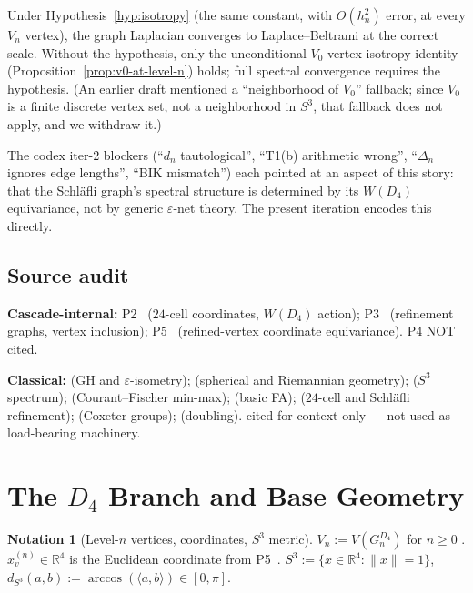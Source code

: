 \documentclass[11pt, a4paper]{amsart}
\theoremstyle{definition}
\newtheorem{notation}[theorem]{Notation}
\newcommand{\R}{\mathbb{R}}
\newcommand{\dsph}{d_{S^3}}
\begin{document}
Under Hypothesis~\ref{hyp:isotropy} (the same constant, with
$O(h_n^2)$ error, at every $V_n$ vertex), the graph Laplacian
converges to Laplace--Beltrami at the correct scale. Without the
hypothesis, only the unconditional $V_0$-vertex isotropy
identity (Proposition~\ref{prop:v0-at-level-n}) holds; full
spectral convergence requires the hypothesis. (An earlier draft
mentioned a ``neighborhood of $V_0$'' fallback; since $V_0$ is
a finite discrete vertex set, not a neighborhood in $S^3$, that
fallback does not apply, and we withdraw it.)

The codex iter-2 blockers (``$d_n$ tautological'', ``T1(b)
arithmetic wrong'', ``$\Delta_n$ ignores edge lengths'', ``BIK
mismatch'') each pointed at an aspect of this story: that the
Schl\"{a}fli graph's spectral structure is determined by its
$W(D_4)$ equivariance, not by generic $\varepsilon$-net theory.
The present iteration encodes this directly.

\subsection{Source audit}

\textbf{Cascade-internal:}
P2~\cite{AlgebraicSubstrate} ($24$-cell coordinates, $W(D_4)$
action);
P3~\cite{RefinementSpaces} (refinement graphs, vertex inclusion);
P5~\cite{MetricProjection} (refined-vertex coordinate
equivariance). P4 NOT cited.

\textbf{Classical:}
\cite{BuragoBuragoIvanov} (GH and $\varepsilon$-isometry);
\cite{doCarmo, PetersenRiemannian} (spherical and Riemannian
geometry); \cite{BerardSpectralGeometry} ($S^3$ spectrum);
\cite[\S VIII.8]{Kato} (Courant--Fischer min-max);
\cite{ReedSimonI} (basic FA);
\cite{CoxeterRegularPolytopes} ($24$-cell and Schl\"{a}fli
refinement); \cite{Humphreys} (Coxeter groups);
\cite{HeinonenAnalysis} (doubling).
\cite{BuragoIvanovKurylev} cited for context only --- not used
as load-bearing machinery.

\section{The $D_4$ Branch and Base Geometry}
\label{sec:D4-base}

\begin{notation}[Level-$n$ vertices, coordinates, $S^3$ metric]
\label{not:basic}
$V_n := V(G_n^{D_4})$ for $n \geq 0$
\cite[Def.~2.1, Def.~2.2]{RefinementSpaces}. $x_v^{(n)} \in \R^4$
is the Euclidean coordinate from P5~\cite[Notation~2.1]{MetricProjection}.
$S^3 := \{x \in \R^4 : \|x\| = 1\}$, $\dsph(a, b) :=
\arccos(\langle a, b \rangle) \in [0, \pi]$.
\end{notation}
\end{document}
